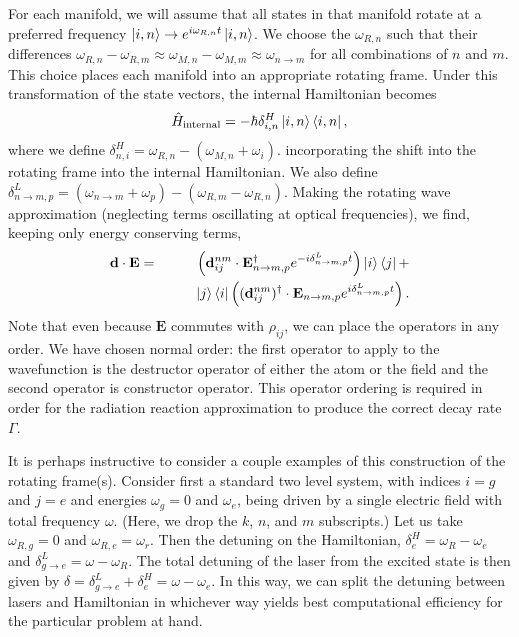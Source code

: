 \documentclass[final,5p,times,twocolumn]{elsarticle}
\begin{document}
For each manifold, we will assume that all states in that manifold rotate at a preferred frequency $\ket{i,n} \rightarrow e^{i \omega_{R,n} t}\ket{i, n}$.  
We choose the $\omega_{R,n}$ such that their differences $\omega_{R,n}-\omega_{R,m} \approx \omega_{M,n}-\omega_{M,m} \approx \omega_{n\rightarrow m}$ for all combinations of $n$ and $m$.
This choice places each manifold into an appropriate rotating frame.
Under this transformation of the state vectors, the internal Hamiltonian becomes
\begin{equation}
	\hat{H}_\text{internal} = -\hbar \delta^H_{i, n} \ket{i,n}\Bra{i, n},
\end{equation}
where we define $\delta^H_{n, i} = \omega_{R,n}-(\omega_{M, n}+\omega_i)$.
incorporating the shift into the rotating frame into the internal Hamiltonian.  We also define $\delta^L_{n\rightarrow m, p} = (\omega_{n\rightarrow m} + \omega_p) - (\omega_{R,m} - \omega_{R,n})$.  Making the rotating wave approximation (neglecting terms oscillating at optical frequencies), we find, keeping only energy conserving terms,
\begin{eqnarray}
	\mathbf{d}\cdot\mathbf{E} & = & \left(\mathbf{d}^{nm}_{ij}\cdot\mathbf{E}^\dagger_{n\rightarrow m,p} e^{-i\delta^L_{n\rightarrow m, p}  t} \right)  \ket{i}\Bra{j} +  \nonumber \\
	& & ~~~~~~ \ket{j}\Bra{i} \left((\mathbf{d}^{nm}_{ij})^\dagger \cdot \mathbf{E}_{n\rightarrow m,p}e^{i\delta^L_{n\rightarrow m, p}t}\right).\label{eq:d_dot_E}
\end{eqnarray}
Note that even because $\mathbf{E}$ commutes with $\rho_{ij}$, we can place the operators in any order.  We have chosen normal order: the first operator to apply to the wavefunction is the destructor operator of either the atom or the field and the second operator is constructor operator.  This operator ordering is required in order for the radiation reaction approximation to produce the correct decay rate $\Gamma$. 

It is perhaps instructive to consider a couple examples of this construction of the rotating frame(s).  Consider first a standard two level system, with indices $i=g$ and $j=e$ and energies $\omega_g=0$ and $\omega_e$, being driven by a single electric field with total frequency $\omega$.   (Here, we drop the $k$, $n$, and $m$ subscripts.)  Let us take $\omega_{R,g}=0$ and $\omega_{R,e}=\omega_r$.  Then the detuning on the Hamiltonian, $\delta^{H}_e = \omega_R - \omega_e$ and $\delta^L_{g\rightarrow e} = \omega - \omega_R$.  The total detuning of the laser from the excited state is then given by $\delta = \delta^L_{g\rightarrow e}+\delta^H_e = \omega-\omega_e$.  In this way, we can split the detuning between lasers and Hamiltonian in whichever way yields best computational efficiency for the particular problem at hand.
\end{document}
